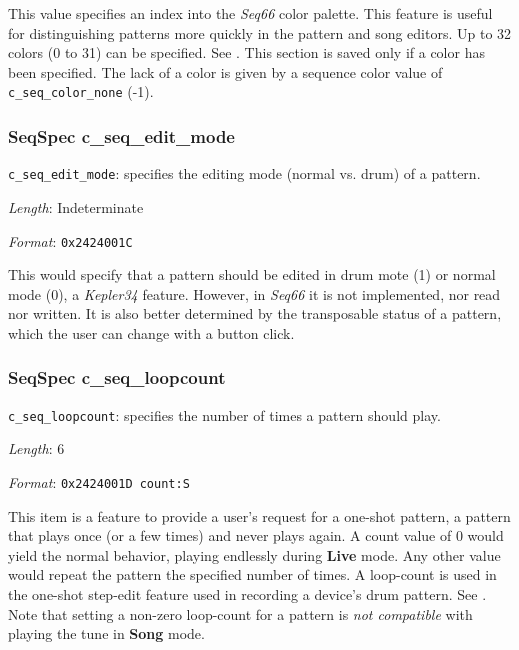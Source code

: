    This value specifies an index into the \textsl{Seq66} color palette.
   This feature is useful for distinguishing patterns more quickly in the
   pattern and song editors. Up to 32 colors (0 to 31) can be specified.
   See .
   This section is saved only if a color has been specified.
   The lack of a color is given by a sequence color value of
   \texttt{c\_seq\_color\_none} (-1).

\subsubsection{SeqSpec c\_seq\_edit\_mode}
\label{subsubsec:midi_format_track_seqspec_seq_edit_mode}

   \begin{description}
      \item \texttt{c\_seq\_edit\_mode}:
         specifies the editing mode (normal vs. drum) of a pattern.
      \item \textsl{Length}: Indeterminate
      \item \textsl{Format}: \texttt{0x2424001C}
   \end{description}

   This would specify that a pattern should be edited in drum
   mote (1) or normal mode (0), a \textsl{Kepler34} feature.
   However, in \textsl{Seq66} it is not implemented, nor read nor written.
   It is also better determined by the transposable status of a pattern,
   which the user can change with a button click.

\subsubsection{SeqSpec c\_seq\_loopcount}
\label{subsubsec:midi_format_track_seqspec_seq_loopcount}

   \begin{description}
      \item \texttt{c\_seq\_loopcount}:
         specifies the number of times a pattern should play.
      \item \textsl{Length}: 6
      \item \textsl{Format}: \texttt{0x2424001D count:S}
   \end{description}

   This item is a feature to provide a user's request for a one-shot
   pattern, a pattern that plays once (or a few times)
   and never plays again.  A count value of 0 would yield
   the normal behavior, playing endlessly during \textbf{Live} mode.
   Any other value would repeat the pattern the specified number of times.
   A loop-count is used in the one-shot step-edit feature used in
   recording a device's drum pattern.
   See .
   Note that setting a non-zero loop-count for a pattern is
   \textsl{not compatible} with playing the tune in \textbf{Song} mode.

